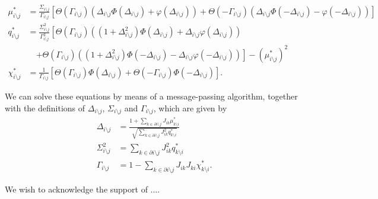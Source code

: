 \documentclass[
    preprint,
    linenumbers,
    amsmath,amssymb,amsfonts,
    aps, physrev,
    superscriptaddress,
    10pt,
    bibnotes
    ]{revtex4-2}
\begin{document}
\begin{subequations}
\begin{align}
\mu_{i\setminus j}^*&=\frac{\Sigma_{i\setminus j}}{\Gamma_{i\setminus j}}\left[\Theta(\Gamma_{i\setminus j})\left(\Delta_{i\setminus j}\Phi(\Delta_{i\setminus j})+\varphi(\Delta_{i\setminus j}) \right)+\Theta(-\Gamma_{i\setminus j}) \left(\Delta_{i\setminus j}\Phi(-\Delta_{i\setminus j})-\varphi(-\Delta_{i\setminus j}) \right)\right]\\
q_{i\setminus j}^*&=\frac{\Sigma^2_{i\setminus j}}{\Gamma^2_{i\setminus j}}\left[\Theta(\Gamma_{i\setminus j})\left(\left(1+\Delta_{i\setminus j}^2\right)\Phi(\Delta_{i\setminus j})+\Delta_{i\setminus j}\varphi(\Delta_{i\setminus j})\right)\right.\nonumber\\
&\quad \left.+\Theta(\Gamma_{i\setminus j})\left(\left(1+\Delta_{i\setminus j}^2\right)\Phi(-\Delta_{i\setminus j})-\Delta_{i\setminus j}\varphi(-\Delta_{i\setminus j})\right)  \right] - \left(\mu_{i\setminus j}^{*}\right)^2\\
\chi_{i\setminus j}^*&=\frac{1}{\Gamma_{i\setminus j}}\left[\Theta(\Gamma_{i\setminus j})\Phi(\Delta_{i\setminus j})+\Theta(-\Gamma_{i\setminus j})\Phi(-\Delta_{i\setminus j})\right].
\end{align}
\end{subequations}

We can solve these equations by means of a message-passing algorithm, together with the definitions of $\Delta_{i\setminus j}$, $\Sigma_{i\setminus j}$ and $\Gamma_{i\setminus j}$, which are given by
\begin{subequations}
\begin{align}
\Delta_{i\setminus j}&=\frac{1+\sum_{k\in \partial i\setminus j}J_{ik}\mu_{k\setminus i}^*}{\sqrt{\sum_{k\in \partial i\setminus j}J_{ik}^2 q_{k\setminus i}^*}}\\
\Sigma_{i\setminus j}^2&=\sum_{k\in \partial i\setminus j}J_{ik}^2 q_{k\setminus i}^*\\
\Gamma_{i\setminus j}&=1-\sum_{k\in\partial i \setminus j}J_{ik}J_{ki}\chi_{k \setminus i}^{*}.
\end{align}
\end{subequations}


\begin{acknowledgments}
We wish to acknowledge the support of ....
\end{acknowledgments}



\appendix
\end{document}
